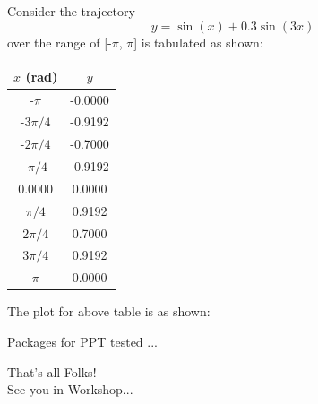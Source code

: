 \documentclass{beamer}
\begin{document}
 \begin{frame}[t]
\vspace{0.5cm}

\noindent Consider the trajectory\footnotemark[2] $$y = \sin(x) + 0.3\sin(3x)$$ over the range of [-$\pi$, $\pi$] is tabulated as shown:
\vskip 0.2cm

\begin{table}[h]
\begin{center} 
{
\begin{tabular}{cc}
\hline
$x$ (rad)	& $y$  		\\ \hline\hline
-$\pi$  	& -0.0000 	\\
-$3\pi/4$ 	& -0.9192	\\
-$2\pi/4$ 	& -0.7000 	\\ \hline
-$\pi/4$ 	& -0.9192	\\
0.0000  	& 0.0000 	\\
$\pi/4$  	& 0.9192	\\ \hline
$2\pi/4$ 	& 0.7000	\\
$3\pi/4$ 	& 0.9192	\\
$\pi$ 		& 0.0000 	\\\hline\hline
\end{tabular}}
\end{center}
\end{table}

\end{frame}
\begin{frame}
 
The plot for above table is as shown:\footnotemark[3]

\begin{minipage}[c]{1\textwidth}
\begin{center}
\end{center}
\end{minipage}

Packages for PPT tested ... 
\end{frame}

\begin{frame}
 \Huge 
 \centering 
  That's all Folks!\\
  {\large See you in Workshop...}
\end{frame}
\end{document}
